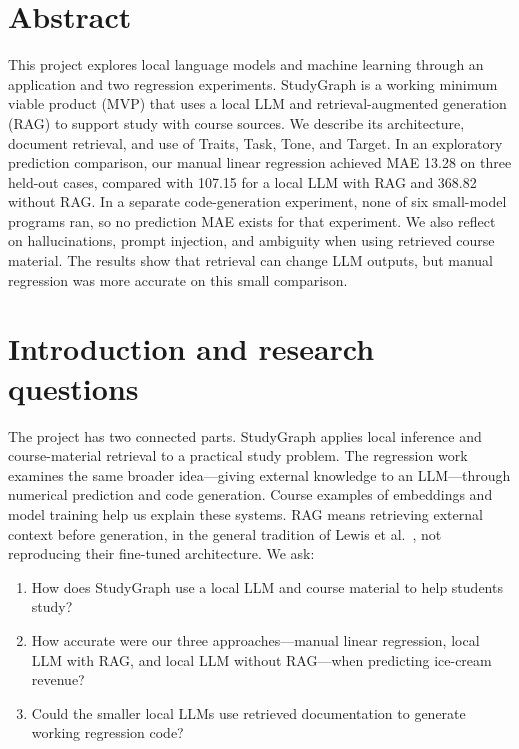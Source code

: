 \documentclass[10pt,a4paper]{article}
\begin{document}
\section*{Abstract}
\small
This project explores local language models and machine learning through an application and two regression experiments.
StudyGraph is a working minimum viable product (MVP) that uses a local LLM and retrieval-augmented generation (RAG) to support study with course sources.
We describe its architecture, document retrieval, and use of Traits, Task, Tone, and Target.
In an exploratory prediction comparison, our manual linear regression achieved MAE 13.28 on three held-out cases,
compared with 107.15 for a local LLM with RAG and 368.82 without RAG.
In a separate code-generation experiment, none of six small-model programs ran, so no prediction MAE exists for that experiment.
We also reflect on hallucinations, prompt injection, and ambiguity when using retrieved course material.
The results show that retrieval can change LLM outputs, but manual regression was more accurate on this small comparison.
\normalsize

\section{Introduction and research questions}
The project has two connected parts.
StudyGraph applies local inference and course-material retrieval to a practical study problem.
The regression work examines the same broader idea---giving external knowledge to an LLM---through numerical prediction and code generation.
Course examples of embeddings and model training help us explain these systems.
RAG means retrieving external context before generation, in the general tradition of Lewis et al.~\cite{lewis2020rag}, not reproducing their fine-tuned architecture.
We ask:
\begin{enumerate}[label=\textbf{RQ\arabic*:},leftmargin=3.2em]
\item How does StudyGraph use a local LLM and course material to help students study?
\item How accurate were our three approaches---manual linear regression, local LLM with RAG, and local LLM without RAG---when predicting ice-cream revenue?
\item Could the smaller local LLMs use retrieved documentation to generate working regression code?
\end{enumerate}

\clearpage








\end{document}
